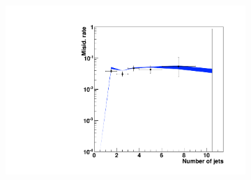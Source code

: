 \begin{figure}
\begin{subfigure}[b]{0.33\textwidth}
                \includegraphics[width=\textwidth]{4_Analisys/pics/8TeV/plots/fakerates/e_eet_leading_kNN_numJets20.pdf}
                \caption{}
        \end{subfigure}


\end{figure}
